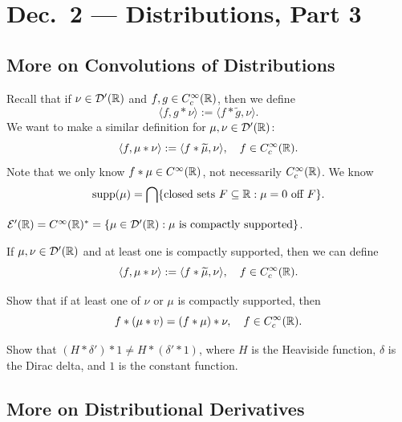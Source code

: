 \chapter{Dec.~2 --- Distributions, Part 3}

\section{More on Convolutions of Distributions}

\begin{remark}
  Recall that if $\nu \in \mathcal{D}'(\mathbb{R})$
  and $f, g \in C^\infty_c(\mathbb{R})$, then we
  define
  \[
    \langle f, g * \nu \rangle
    := \langle f * \widetilde{g}, \nu \rangle.
  \]
  We want to make a similar
  definition for $\mu, \nu \in \mathcal{D}'(\mathbb{R})$:
  \[
    \langle f, \mu * \nu \rangle
    := \langle f * \widetilde{\mu}, \nu \rangle,
    \quad f \in C^\infty_c(\mathbb{R}).
  \]
  Note that we only know
  $f * \mu \in C^\infty(\mathbb{R})$,
  not necessarily $C^\infty_c(\mathbb{R})$. We know
  \[
    \operatorname{supp}(\mu)
    = \bigcap \{\text{closed sets $F \subseteq \mathbb{R}$} : \text{$\mu = 0$ off $F$}\}.
  \]
\end{remark}

\begin{theorem}
  $\mathcal{E}'(\mathbb{R}) = C^\infty(\mathbb{R})^* = \{\mu \in \mathcal{D}'(\mathbb{R}) : \mu \text{ is compactly supported}\}$.
\end{theorem}

\begin{definition}
  If $\mu, \nu \in \mathcal{D}'(\mathbb{R})$
  and at least one is compactly supported,
  then we can define
  \[
    \langle f, \mu * \nu \rangle
    := \langle f * \widetilde{\mu}, \nu \rangle,
    \quad f \in C^\infty_c(\mathbb{R}).
  \]
\end{definition}

\begin{exercise}
  Show that if at least
  one of $\nu$ or $\mu$  is compactly
  supported, then
  \[
    f * (\mu * v) = (f * \mu) * \nu,
    \quad f \in C^\infty_c(\mathbb{R}).
  \]
\end{exercise}

\begin{exercise}
  Show that
  $(H * \delta') * 1 \ne H * (\delta' * 1)$,
  where $H$ is the Heaviside function,
  $\delta$ is the Dirac delta, and
  $1$ is the constant function.
\end{exercise}

\section{More on Distributional Derivatives}

